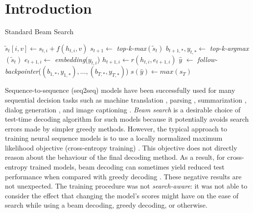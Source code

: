 \documentclass[letterpaper]{article} \usepackage{aaai18}  \usepackage{times}  \usepackage{helvet}  \usepackage{courier}  \usepackage{url}  \usepackage{graphicx}  \frenchspacing
\begin{document}
\section{Introduction}
\begin{algorithm*}[t]
\caption{Standard Beam Search}\label{hard}
\begin{algorithmic}[1]
\State $\tilde{s}_t[i,v] \gets s_{t,i} + f(h_{t,i},v)$ 
\EndFor
\EndFor
 \State $s_{t+1} \gets$ \textit{top-k-max}$(\tilde{s}_t)$ 
 \State $\textit{b}_{t+1, *}, y_{t, *} \gets$ \textit{top-k-argmax}$(\tilde{s}_t)$ 
  \State $e_{t+1,i} \gets$ \textit{embedding}($y_{t,i}$)
  \State $h_{t+1,i} \gets r(h_{t,i},e_{t+1,i})$ 
 \EndFor
\EndFor
 \State $\hat{y}$ $\gets$ \textit{follow-backpointer}($(b_{1,*},y_{1,*}),\ldots, (b_{T,*},y_{T,*})$)
 \State $s(\hat{y}) \gets \textit{max}(s_T)$
\end{algorithmic}
\end{algorithm*}
Sequence-to-sequence (seq2seq) models have been successfully used for many sequential decision tasks such as machine translation \cite{sutskever2014sequence,bahdanau2014neural}, parsing \cite{dyer2016recurrent,dyer2015transition}, summarization \cite{rush2015neural}, dialog generation \cite{serban2015building}, and image captioning \cite{xu2015show}.
\textit{Beam search} is a desirable choice of test-time decoding algorithm for such models because it potentially avoids search errors made by simpler greedy methods. However, the typical approach to training neural sequence models is to use a locally normalized maximum likelihood objective (cross-entropy training) \cite{sutskever2014sequence}. This objective does not directly reason about the behaviour of the final decoding method. As a result, for cross-entropy trained models, beam decoding can sometimes yield reduced test performance when compared with greedy decoding \cite{koehn2017six,neubig2017neural,cho2014properties}.
These negative results are not unexpected. The training procedure was not \emph{search-aware}: it was not able to consider the effect that changing the model's scores might have on the ease of search while using a beam decoding, greedy decoding, or otherwise. 
\end{document}
